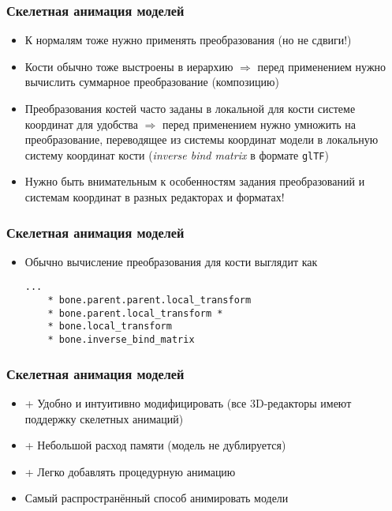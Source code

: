 \documentclass{beamer}
\begin{document}
\begin{frame}[fragile]
\frametitle{Скелетная анимация моделей}
\begin{itemize}
\item К нормалям тоже нужно применять преобразования (но не сдвиги!)
\pause
\item Кости обычно тоже выстроены в иерархию \begin{math}\Rightarrow\end{math} перед применением нужно вычислить суммарное преобразование (композицию)
\pause
\item Преобразования костей часто заданы в локальной для кости системе координат для удобства \begin{math}\Rightarrow\end{math} перед применением нужно умножить на преобразование, переводящее из системы координат модели в локальную систему координат кости (\textit{inverse bind matrix} в формате \verb|glTF|)
\pause
\item Нужно быть внимательным к особенностям задания преобразований и системам координат в разных редакторах и форматах!
\end{itemize}
\end{frame}

\begin{frame}[fragile]
\frametitle{Скелетная анимация моделей}
\begin{itemize}
\item Обычно вычисление преобразования для кости выглядит как
\begin{verbatim}
...
    * bone.parent.parent.local_transform
    * bone.parent.local_transform *
    * bone.local_transform
    * bone.inverse_bind_matrix
\end{verbatim}
\end{itemize}
\end{frame}

\begin{frame}[fragile]
\frametitle{Скелетная анимация моделей}
\begin{itemize}
\item {\color{green}+} Удобно и интуитивно модифицировать (все 3D-редакторы имеют поддержку скелетных анимаций)
\pause
\item {\color{green}+} Небольшой расход памяти (модель не дублируется)
\pause
\item {\color{green}+} Легко добавлять процедурную анимацию
\pause
\item Самый распространённый способ анимировать модели
\end{itemize}
\end{frame}
\end{document}
